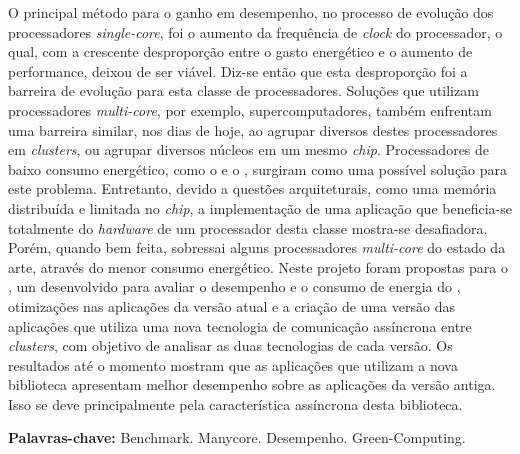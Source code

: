 \begin{resumo}[Resumo]
  O principal método para o ganho em desempenho, no processo de evolução dos processadores \textit{single-core}, foi o aumento da frequência de \textit{clock} do processador, o qual, com a crescente desproporção entre o gasto energético e o aumento de performance, deixou de ser viável. Diz-se então que esta desproporção foi a barreira de evolução para esta classe de processadores. Soluções que utilizam processadores \textit{multi-core}, por exemplo, supercomputadores, também enfrentam uma barreira similar, nos dias de hoje, ao agrupar diversos destes processadores em \textit{clusters}, ou agrupar diversos núcleos em um mesmo \textit{chip}. Processadores \manycore de baixo consumo energético, como o \mppa e o \epiphany, surgiram como uma possível solução para este problema. Entretanto, devido a questões arquiteturais, como uma memória distribuída e limitada no \textit{chip}, a implementação de uma aplicação que beneficia-se totalmente do \textit{hardware} de um processador desta classe mostra-se desafiadora. Porém, quando bem feita, sobressai alguns processadores \textit{multi-core} do estado da arte, através do menor consumo energético. Neste projeto foram propostas para o \capb, um \bench desenvolvido para avaliar o desempenho e o consumo de energia do \mppa, otimizações nas aplicações da versão atual e a criação de uma versão das aplicações que utiliza uma nova tecnologia de comunicação assíncrona entre \textit{clusters}, com objetivo de analisar as duas tecnologias de cada versão. Os resultados até o momento mostram que as aplicações que utilizam a nova biblioteca apresentam melhor desempenho sobre as aplicações da versão antiga. Isso se deve principalmente pela característica assíncrona desta biblioteca.



  \vspace{\baselineskip} 
  \textbf{Palavras-chave:} Benchmark. Manycore. Desempenho. Green-Computing.
\end{resumo}


